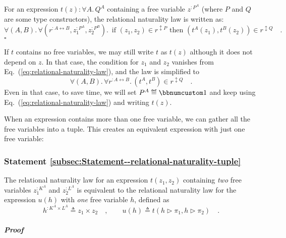 For an expression $t(z):\forall A.\,Q^{A}$ containing a free variable
$z^{:P^{A}}$ (where $P$ and $Q$ are some type constructors), the
relational naturality law is written as:
\begin{equation}
\forall(A,B).\,\forall(r^{:A\leftrightarrow B},z_{1}^{:P^{A}},z_{2}^{:P^{B}}).\,\text{ if }(z_{1},z_{2})\in r^{\updownarrow P}\text{ then }(t^{A}(z_{1}),t^{B}(z_{2}))\in r^{\updownarrow Q}\quad.\label{eq:relational-naturality-law}
\end{equation}
$\square$

If $t$ contains no free variables, we may still write $t$ as $t(z)$
although it does not depend on $z$. In that case, the condition for
$z_{1}$ and $z_{2}$ vanishes from Eq.~(\ref{eq:relational-naturality-law}),
and the law is simplified to
\begin{equation}
\forall(A,B).\,\forall r^{:A\leftrightarrow B}.\,(t^{A},t^{B})\in r^{\updownarrow Q}\quad.\label{eq:relational-naturality-law-simplified}
\end{equation}
Even in that case, to save time, we will set $P^{A}\triangleq\bbnum 1$
and keep using Eq.~(\ref{eq:relational-naturality-law}) and writing
$t(z)$.

When an expression contains more than one free variable, we can gather
all the free variables into a tuple. This creates an equivalent expression
with just one free variable:

\subsubsection{Statement \label{subsec:Statement--relational-naturality-tuple}\ref{subsec:Statement--relational-naturality-tuple} }

The relational naturality law for an expression $t(z_{1},z_{2})$
containing \emph{two} free variables $z_{1}^{:K^{A}}$ and $z_{2}^{:L^{A}}$
is equivalent to the relational naturality law for the expression
$u(h)$ with \emph{one} free variable $h$, defined as
\[
h^{:K^{A}\times L^{A}}\triangleq z_{1}\times z_{2}\quad,\quad\quad u(h)\triangleq t(h\triangleright\pi_{1},h\triangleright\pi_{2})\quad.
\]


\subparagraph{Proof}

